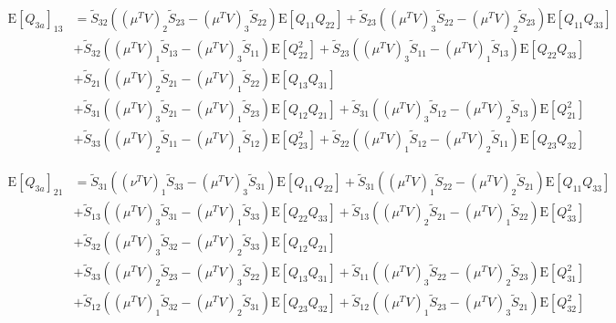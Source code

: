 \documentclass[10pt]{article}
\newcommand{\expect}[1]{\ensuremath{\mathrm{E}\left[ #1 \right]}}
\begin{document}
\begin{align}
	\expect{Q_{3a}}_{13} &= \tilde{S}_{32}\left( (\mu^TV)_2\tilde{S}_{23}-(\mu^TV)_3\tilde{S}_{22} \right)\expect{Q_{11}Q_{22}} + \tilde{S}_{23}\left( (\mu^TV)_3\tilde{S}_{22}-(\mu^TV)_2\tilde{S}_{23} \right)\expect{Q_{11}Q_{33}} \nonumber \\
	&+ \tilde{S}_{32}\left( (\mu^TV)_1\tilde{S}_{13}-(\mu^TV)_3\tilde{S}_{11} \right)\expect{Q_{22}^2} + \tilde{S}_{23}\left( (\mu^TV)_3\tilde{S}_{11}-(\mu^TV)_1\tilde{S}_{13} \right)\expect{Q_{22}Q_{33}} \nonumber \\
	&+ \tilde{S}_{21}\left( (\mu^TV)_2\tilde{S}_{21}-(\mu^TV)_1\tilde{S}_{22} \right)\expect{Q_{13}Q_{31}} \nonumber \\
	&+ \tilde{S}_{31}\left( (\mu^TV)_{3}\tilde{S}_{21}-(\mu^TV)_{1}\tilde{S}_{23} \right)\expect{Q_{12}Q_{21}} + \tilde{S}_{31}\left( (\mu^TV)_3\tilde{S}_{12}-(\mu^TV)_2\tilde{S}_{13} \right)\expect{Q_{21}^2} \nonumber \\
	&+ \tilde{S}_{33}\left( (\mu^TV)_2\tilde{S}_{11}-(\mu^TV)_1\tilde{S}_{12} \right)\expect{Q_{23}^2} + \tilde{S}_{22}\left( (\mu^TV)_1\tilde{S}_{12}-(\mu^TV)_2\tilde{S}_{11} \right)\expect{Q_{23}Q_{32}}
\end{align}

\begin{align}
	\expect{Q_{3a}}_{21} &= \tilde{S}_{31}\left( (\nu^TV)_1\tilde{S}_{33}-(\mu^TV)_{3}\tilde{S}_{31} \right)\expect{Q_{11}Q_{22}} + \tilde{S}_{31}\left( (\mu^TV)_1\tilde{S}_{22}-(\mu^TV)_2\tilde{S}_{21} \right)\expect{Q_{11}Q_{33}} \nonumber \\
	&+ \tilde{S}_{13}\left( (\mu^TV)_3\tilde{S}_{31}-(\mu^TV)_1\tilde{S}_{33} \right)\expect{Q_{22}Q_{33}} + \tilde{S}_{13}\left( (\mu^TV)_2\tilde{S}_{21}-(\mu^TV)_1\tilde{S}_{22} \right)\expect{Q_{33}^2} \nonumber \\
	&+ \tilde{S}_{32}\left( (\mu^TV)_3\tilde{S}_{32}-(\mu^TV)_2\tilde{S}_{33} \right)\expect{Q_{12}Q_{21}} \nonumber \\
	&+ \tilde{S}_{33}\left( (\mu^TV)_2\tilde{S}_{23}-(\mu^TV)_3\tilde{S}_{22} \right)\expect{Q_{13}Q_{31}} + \tilde{S}_{11}\left( (\mu^TV)_3\tilde{S}_{22}-(\mu^TV)_2\tilde{S}_{23} \right)\expect{Q_{31}^2} \nonumber \\
	&+ \tilde{S}_{12}\left( (\mu^TV)_1\tilde{S}_{32}-(\mu^TV)_2\tilde{S}_{31} \right)\expect{Q_{23}Q_{32}} + \tilde{S}_{12}\left( (\mu^TV)_1\tilde{S}_{23}-(\mu^TV)_3\tilde{S}_{21} \right)\expect{Q_{32}^2}
\end{align}
\end{document}

